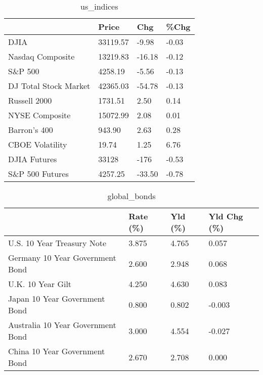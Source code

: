 \documentclass{article}%
\begin{document}
%


\begin{table}[htbp]%
\caption{us\_indices}%
\centering%
\begin{adjustbox}{width=1\textwidth}%
\begin{tabular}{llll}
\toprule
                      &    Price &    Chg &  \%Chg \\
\midrule
                 DJIA & 33119.57 &  -9.98 & -0.03 \\
     Nasdaq Composite & 13219.83 & -16.18 & -0.12 \\
              S\&P 500 &  4258.19 &  -5.56 & -0.13 \\
DJ Total Stock Market & 42365.03 & -54.78 & -0.13 \\
         Russell 2000 &  1731.51 &   2.50 &  0.14 \\
       NYSE Composite & 15072.99 &   2.08 &  0.01 \\
         Barron's 400 &   943.90 &   2.63 &  0.28 \\
      CBOE Volatility &    19.74 &   1.25 &  6.76 \\
         DJIA Futures &    33128 &   -176 & -0.53 \\
      S\&P 500 Futures &  4257.25 & -33.50 & -0.78 \\
\bottomrule
\end{tabular}
%
\end{adjustbox}%
\end{table}

%


\begin{table}[htbp]%
\caption{global\_bonds}%
\centering%
\begin{adjustbox}{width=1\textwidth}%
\begin{tabular}{llll}
\toprule
                                  & Rate (\%) & Yld (\%) & Yld Chg (\%) \\
\midrule
       U.S. 10 Year Treasury Note &    3.875 &   4.765 &       0.057 \\
  Germany 10 Year Government Bond &    2.600 &   2.948 &       0.068 \\
                U.K. 10 Year Gilt &    4.250 &   4.630 &       0.083 \\
    Japan 10 Year Government Bond &    0.800 &   0.802 &      -0.003 \\
Australia 10 Year Government Bond &    3.000 &   4.554 &      -0.027 \\
    China 10 Year Government Bond &    2.670 &   2.708 &       0.000 \\
\bottomrule
\end{tabular}
%
\end{adjustbox}%
\end{table}
\end{document}
